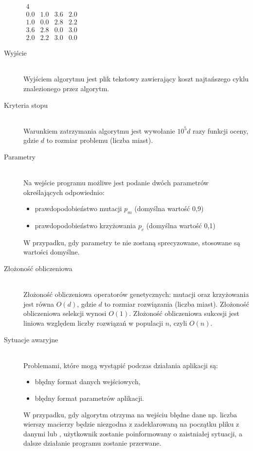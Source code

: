 \documentclass[12pt, a4paper]{article}
\begin{document}
\begin{description}
\bigskip
$ 
\begin{array}{llll}
4 \\
0.0 & 1.0 & 3.6 & 2.0 \\
1.0 & 0.0 & 2.8 & 2.2 \\
3.6 & 2.8 & 0.0 & 3.0 \\
2.0 & 2.2 & 3.0 & 0.0
\end{array}
$
	\item[Wyjście] \hfill \\
	Wyjściem algorytmu jest plik tekstowy zawierający koszt najtańszego cyklu znalezionego przez algorytm.
	\item[Kryteria stopu] \hfill \\
	Warunkiem zatrzymania algorytmu jest wywołanie $10^5d$ razy funkcji oceny, gdzie $d$ to rozmiar problemu (liczba miast).
	\item[Parametry] \hfill \\
	Na wejście programu możliwe jest podanie dwóch parametrów określających odpowiednio:
		\begin{itemize}
			\item prawdopodobieństwo mutacji $p_m$ (domyślna wartość 0,9)
			\item prawdopodobieństwo krzyżowania $p_c$ (domyślna wartość 0,1)
		\end{itemize}
		W przypadku, gdy parametry te nie zostaną sprecyzowane, stosowane są wartości domyślne.
	\item[Złożoność obliczeniowa] \hfill \\
	Złożoność obliczeniowa operatorów genetycznych: mutacji oraz krzyżowania jest równa $O(d)$, 
gdzie $d$ to rozmiar rozwiązania (liczba miast). Złożoność obliczeniowa selekcji wynosi $O(1)$. Złożoność obliczeniowa
sukcesji jest liniowa względem liczby rozwiązań w populacji $n$, czyli $O(n)$. 
	\item[Sytuacje awaryjne] \hfill \\
Problemami, które mogą wystąpić podczas działania aplikacji są:
	\begin{itemize}
        \item błędny format danych wejściowych,
        \item błędny format parametrów aplikacji.
	\end{itemize}

W przypadku, gdy algorytm otrzyma na wejściu błędne dane np. liczba wierszy macierzy będzie niezgodna z zadeklarowaną na początku pliku z danymi lub , użytkownik zostanie poinformowany o zaistniałej sytuacji, a dalsze działanie programu zostanie przerwane.

\end{description}
\end{document}
